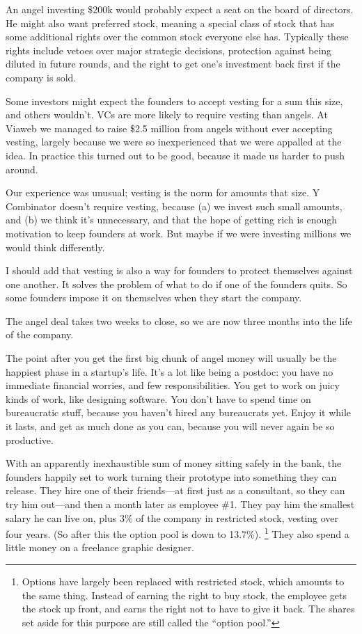 An angel investing \$200k would probably expect a seat on the board of
directors. He might also want preferred stock, meaning a special class
of stock that has some additional rights over the common stock everyone
else has. Typically these rights include vetoes over major strategic
decisions, protection against being diluted in future rounds, and the
right to get one's investment back first if the company is sold.

Some investors might expect the founders to accept vesting for a sum
this size, and others wouldn't. VCs are more likely to require vesting
than angels. At Viaweb we managed to raise \$2.5 million from angels
without ever accepting vesting, largely because we were so inexperienced
that we were appalled at the idea. In practice this turned out to be
good, because it made us harder to push around.

Our experience was unusual; vesting is the norm for amounts that size. Y
Combinator doesn't require vesting, because (a) we invest such small
amounts, and (b) we think it's unnecessary, and that the hope of getting
rich is enough motivation to keep founders at work. But maybe if we were
investing millions we would think differently.

I should add that vesting is also a way for founders to protect
themselves against one another. It solves the problem of what to do if
one of the founders quits. So some founders impose it on themselves when
they start the company.

The angel deal takes two weeks to close, so we are now three months into
the life of the company.

The point after you get the first big chunk of angel money will usually
be the happiest phase in a startup's life. It's a lot like being a
postdoc: you have no immediate financial worries, and few
responsibilities. You get to work on juicy kinds of work, like designing
software. You don't have to spend time on bureaucratic stuff, because
you haven't hired any bureaucrats yet. Enjoy it while it lasts, and get
as much done as you can, because you will never again be so productive.

With an apparently inexhaustible sum of money sitting safely in the
bank, the founders happily set to work turning their prototype into
something they can release. They hire one of their friends---at first
just as a consultant, so they can try him out---and then a month later
as employee \#1. They pay him the smallest salary he can live on, plus
3\% of the company in restricted stock, vesting over four years. (So
after this the option pool is down to 13.7\%). \footnote{Options have largely been replaced with restricted stock, which
amounts to the same thing. Instead of earning the right to buy stock,
the employee gets the stock up front, and earns the right not to have to
give it back. The shares set aside for this purpose are still called the
``option pool.''}
They also spend a little money on a freelance graphic designer.

